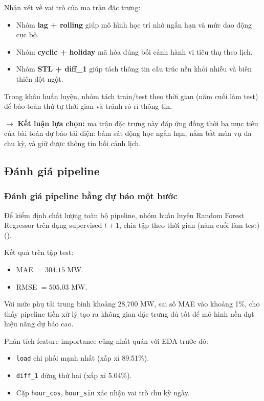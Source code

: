 Nhận xét về vai trò của ma trận đặc trưng:
\begin{itemize}
    \item Nhóm \textbf{lag + rolling} giúp mô hình học trí nhớ ngắn hạn và mức dao động cục bộ.
    \item Nhóm \textbf{cyclic + holiday} mã hóa đúng bối cảnh hành vi tiêu thụ theo lịch.
    \item Nhóm \textbf{STL + diff\_1} giúp tách thông tin cấu trúc nền khỏi nhiễu và biến thiên đột ngột.
\end{itemize}

Trong khâu huấn luyện, nhóm tách train/test theo thời gian (năm cuối làm test) để bảo toàn thứ tự thời gian và tránh rò rỉ thông tin.

$\rightarrow$ \textbf{Kết luận lựa chọn:} ma trận đặc trưng này đáp ứng đồng thời ba mục tiêu của bài toán dự báo tải điện: bám sát động học ngắn hạn, nắm bắt mùa vụ đa chu kỳ, và giữ được thông tin bối cảnh lịch.

\subsection{Đánh giá pipeline}
\subsubsection{Đánh giá pipeline bằng dự báo một bước}
Để kiểm định chất lượng toàn bộ pipeline, nhóm huấn luyện Random Forest Regressor trên dạng supervised $t+1$, chia tập theo thời gian (năm cuối làm test) (\cite{breiman2001random}).

Kết quả trên tập test:
\begin{itemize}
    \item MAE $=304.15$ MW.
    \item RMSE $=505.03$ MW.
\end{itemize}

Với mức phụ tải trung bình khoảng 28{,}700 MW, sai số MAE vào khoảng 1\%, cho thấy pipeline tiền xử lý tạo ra không gian đặc trưng đủ tốt để mô hình nền đạt hiệu năng dự báo cao.

Phân tích feature importance cũng nhất quán với EDA trước đó:
\begin{itemize}
    \item \texttt{load} chi phối mạnh nhất (xấp xỉ 89.51\%).
    \item \texttt{diff\_1} đứng thứ hai (xấp xỉ 5.04\%).
    \item Cặp \texttt{hour\_cos}, \texttt{hour\_sin} xác nhận vai trò chu kỳ ngày.
\end{itemize}


